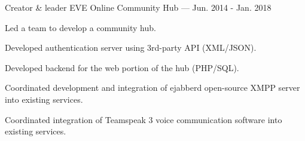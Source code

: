 

\begin{cventries}

  \cventry
    {Creator \& leader} %
    {EVE Online Community Hub} %
    {---} %
    {Jun. 2014 - Jan. 2018} %
    {
      \begin{cvitems} %
        \item {Led a team to develop a community hub.}
        \item {Developed authentication server using 3rd-party API (XML/JSON).}
        \item {Developed backend for the web portion of the hub (PHP/SQL).}
        \item {Coordinated development and integration of ejabberd open-source XMPP server into existing services.}
        \item {Coordinated integration of Teamspeak 3 voice communication software into existing services.}
      \end{cvitems}
    }
\end{cventries}
